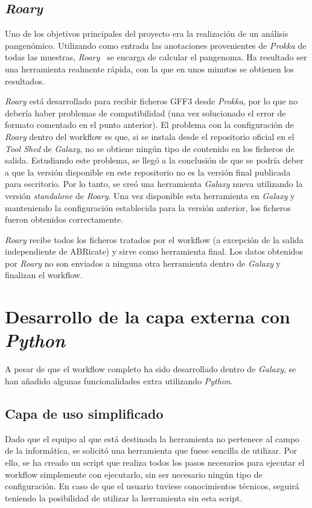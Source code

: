 \subsection{\itshape{Roary}}
Uno de los objetivos principales del proyecto era la realización de un análisis pangenómico. Utilizando como entrada las anotaciones provenientes de \textit{Prokka} de todas las muestras, \textit{Roary}~\cite{Page2015} se encarga de calcular el pangenoma. Ha resultado ser una herramienta realmente rápida, con la que en unos minutos se obtienen los resultados.

\textit{Roary} está desarrollado para recibir ficheros GFF3 desde \textit{Prokka}, por lo que no debería haber problemas de compatibilidad (una vez solucionado el error de formato comentado en el punto anterior). El problema con la configuración de \textit{Roary} dentro del workflow es que, si se instala desde el repositorio oficial en el \textit{Tool Shed} de \textit{Galaxy}, no se obtiene ningún tipo de contenido en los ficheros de salida. Estudiando este problema, se llegó a la conclusión de que se podría deber a que la versión disponible en este repositorio no es la versión final publicada para escritorio. Por lo tanto, se creó una herramienta \textit{Galaxy} nueva utilizando la versión \textit{standalone} de \textit{Roary}. Una vez disponible esta herramienta en \textit{Galaxy} y manteniendo la configuración establecida para la versión anterior, los ficheros fueron obtenidos correctamente.

\textit{Roary} recibe todos los ficheros tratados por el workflow (a excepción de la salida independiente de ABRicate) y sirve como herramienta final. Los datos obtenidos por \textit{Roary} no son enviados a ninguna otra herramienta dentro de \textit{Galaxy} y finalizan el workflow.


\section{Desarrollo de la capa externa con \itshape{Python}}
A pesar de que el workflow completo ha sido desarrollado dentro de \textit{Galaxy}, se han añadido algunas funcionalidades extra utilizando \textit{Python}.

\subsection{Capa de uso simplificado}
Dado que el equipo al que está destinada la herramienta no pertenece al campo de la informática, se solicitó una herramienta que fuese sencilla de utilizar. Por ello, se ha creado un script que realiza todos los pasos necesarios para ejecutar el workflow simplemente con ejecutarlo, sin ser necesario ningún tipo de configuración. En caso de que el usuario tuviese conocimientos técnicos, seguirá teniendo la posibilidad de utilizar la herramienta sin esta script.

